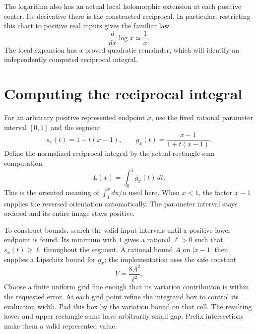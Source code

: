 The logarithm also has an actual local holomorphic extension at each positive
center. Its derivative there is the constructed reciprocal. In particular,
restricting this chart to positive real inputs gives the familiar law
\[
 \frac{d}{dx}\log x\simeq\frac1x.
\]
The local expansion has a proved quadratic remainder, which will identify an
independently computed reciprocal integral.

\leanok

\section{Computing the reciprocal integral}\label{sec:integral-logarithm}

For an arbitrary positive represented endpoint $x$, use the fixed rational
parameter interval $[0,1]$ and the segment
\[
 s_x(t)=1+t(x-1),\qquad
 g_x(t)=\frac{x-1}{1+t(x-1)}.
\]
Define the normalized reciprocal integral by the actual rectangle-sum
computation
\[
 L(x)=\int_0^1 g_x(t)\,dt.
\]
This is the oriented meaning of $\int_1^x du/u$ used here. When $x<1$, the
factor $x-1$ supplies the reversed orientation automatically. The parameter
interval stays ordered and its entire image stays positive.

To construct bounds, search the valid input intervals until a positive lower
endpoint is found. Its minimum with $1$ gives a rational $\ell>0$ such that
$s_x(t)\geq\ell$ throughout the segment. A rational bound $A$ on $|x-1|$
then supplies a Lipschitz bound for $g_x$; the implementation uses the safe
constant
\[
 V=\frac{8A^2}{\ell^2}.
\]
Choose a finite uniform grid fine enough that its variation contribution is
within the requested error. At each grid point refine the integrand box to
control its evaluation width. Pad this box by the variation bound on that
cell. The resulting lower and upper rectangle sums have arbitrarily small
gap. Prefix intersections make them a valid represented value.

\leanok


